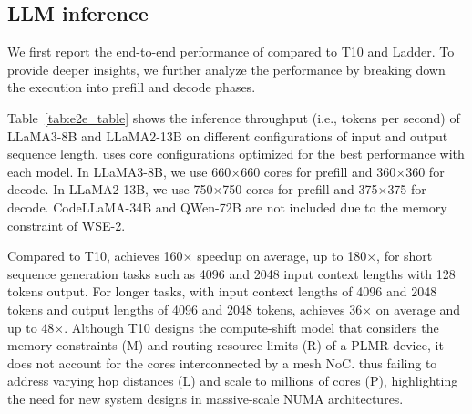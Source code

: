 \vspace{-0.2cm}
\subsection{LLM inference} \label{sec:eval:e2e}

We first report the end-to-end performance of \sys{} compared to T10 and Ladder. To provide deeper insights, we further analyze the performance by breaking down the execution into prefill and decode phases.



\begin{table}[t]
  \centering
  \caption{End-to-end LLM inference throughput (tokens/s)}
  \label{tab:e2e_table}%
\end{table}%

 Table~\ref{tab:e2e_table} shows the inference throughput (i.e., tokens per second) of LLaMA3-8B and LLaMA2-13B on different configurations of input and output sequence length. \sys{} uses core configurations optimized for the best performance with each model.
In LLaMA3-8B, we use 660$\times$660 cores for prefill and 360$\times$360 for decode.
In LLaMA2-13B, we use 750$\times$750 cores for prefill and 375$\times$375 for decode.
CodeLLaMA-34B and QWen-72B are not included due to the memory constraint of WSE-2.

Compared to T10, \sys{} achieves 160$\times$ speedup on average, up to 180$\times$, for short sequence generation tasks such as 4096 and 2048 input context lengths with 128 tokens output. For longer tasks, with input context lengths of 4096 and 2048 tokens and output lengths of 4096 and 2048 tokens, \sys{} achieves 36$\times$ on average and up to 48$\times$. Although T10 designs the compute-shift model that considers the memory constraints (M) and routing resource limits (R) of a PLMR device, it does not account for the cores interconnected by a mesh NoC. thus failing to address varying hop distances (L) and scale to millions of cores (P), highlighting the need for new system designs in massive-scale NUMA architectures.


